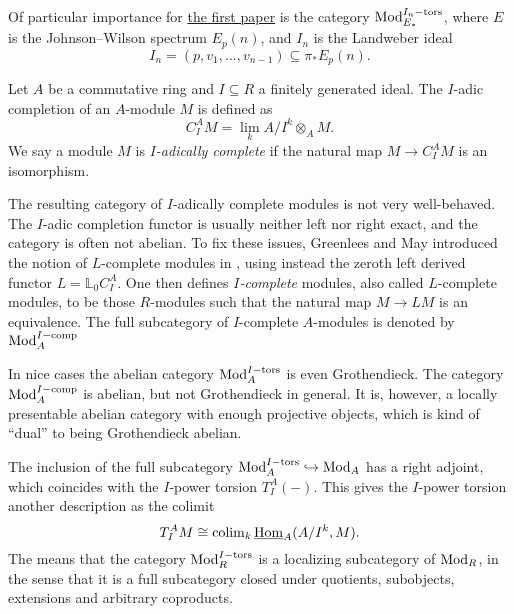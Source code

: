 \begin{example}
    Of particular importance for \hyperref[ch1]{the first paper} is the category $\mathrm{Mod}_{E_*}^{I_n-\mathrm{tors}}$, where $E$ is the Johnson--Wilson spectrum $E_p(n)$, and $I_n$ is the Landweber ideal 
    \[I_n = (p, v_1, \ldots, v_{n-1})\subseteq \pi_* E_p(n).\]
\end{example}

\begin{definition}
    Let $A$ be a commutative ring and $I\subseteq R$ a finitely generated ideal. The $I$-adic completion of an $A$-module $M$ is defined as
    \[C_I^A M = \lim_k A/I^k\otimes_A M.\]
    We say a module $M$ is \emph{$I$-adically complete} if the natural map $M\longrightarrow C_I^A M$ is an isomorphism. 
\end{definition}

\begin{remark}
    \label{ch0:rm:I-complete-vs-I-adically-complete}
    The resulting category of $I$-adically complete modules is not very well-behaved. The $I$-adic completion functor is usually neither left nor right exact, and the category is often not abelian. To fix these issues, Greenlees and May introduced the notion of $L$-complete modules in \cite{greenlees-may_92}, using instead the zeroth left derived functor $L=\mathbb{L}_0 C_I^A$. One then defines \emph{$I$-complete} modules, also called $L$-complete modules, to be those $R$-modules such that the natural map $M\longrightarrow L M$ is an equivalence. The full subcategory of $I$-complete $A$-modules is denoted by $\mathrm{Mod}_A^{I-\mathrm{comp}}$
\end{remark}

\begin{remark}
    In nice cases the abelian category $\mathrm{Mod}_A^{I-\mathrm{tors}}$ is even Grothendieck. The category $\mathrm{Mod}_A^{I-\mathrm{comp}}$ is abelian, but not Grothendieck in general. It is, however, a locally presentable abelian category with enough projective objects, which is kind of ``dual'' to being Grothendieck abelian. 
\end{remark}

\begin{remark}
    The inclusion of the full subcategory $\mathrm{Mod}_A^{I-\mathrm{tors}}\hookrightarrow \mathrm{Mod}_A$ has a right adjoint, which coincides with the $I$-power torsion $T_I^A(-)$. This gives the $I$-power torsion another description as the colimit 
    \[T_I^A M \cong \operatorname{colim}_k \operatorname{\underline{Hom}}_A (A/I^k, M).\]
    The means that the category $\mathrm{Mod}_R^{I-\mathrm{tors}}$ is a localizing subcategory of $\mathrm{Mod}_R$, in the sense that it is a full subcategory closed under quotients, subobjects, extensions and arbitrary coproducts. 
\end{remark}

